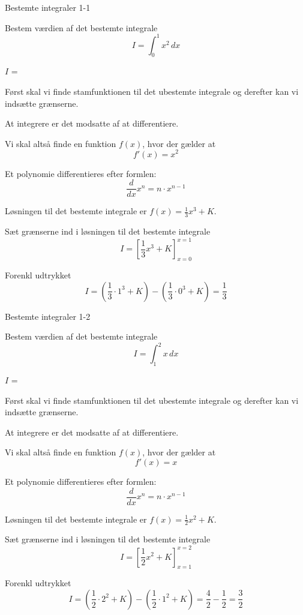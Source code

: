 \documentclass{article}
\begin{document}
\tableofcontents

\begin{exercise}{Bestemte integraler 1-1}

Bestem værdien af det bestemte integrale
\[
I = \int_0^1 x^2 \, dx
\]

$I$ =  


\hint
Først skal vi finde stamfunktionen til det ubestemte integrale og derefter kan vi indsætte grænserne.

\hint
At integrere er det modsatte af at differentiere.

\hint
Vi skal altså finde en funktion $f(x)$, hvor der gælder at
\[
f'(x) = x^2
\]

\hint
Et polynomie differentieres efter formlen:
\[
\frac{d}{dx} x^n = n \cdot x^{n - 1}
\]

\hint
Løsningen til det bestemte integrale er $f(x) = \frac{1}{3} x^3 + K$.

\hint
Sæt grænserne ind i løsningen til det bestemte integrale
\[
I = \left[ \frac{1}{3} x^3 + K \right]_{x=0}^{x=1}
\]

\hint
Forenkl udtrykket
\[
I = \left( \frac{1}{3} \cdot 1^3 + K \right) - \left( \frac{1}{3} \cdot 0^3 + K \right) = \frac{1}{3}
\]


\end{exercise}

\newpage

\begin{exercise}{Bestemte integraler 1-2}
	
	Bestem værdien af det bestemte integrale
	\[
	I = \int_1^2 x \, dx
	\]
	
	$I$ =  
	
	
	\hint
	Først skal vi finde stamfunktionen til det ubestemte integrale og derefter kan vi indsætte grænserne.
	
	\hint
	At integrere er det modsatte af at differentiere.
	
	\hint
	Vi skal altså finde en funktion $f(x)$, hvor der gælder at
	\[
	f'(x) = x
	\]
	
	\hint
	Et polynomie differentieres efter formlen:
	\[
	\frac{d}{dx} x^n = n \cdot x^{n - 1}
	\]
	
	\hint
	Løsningen til det bestemte integrale er $f(x) = \frac{1}{2} x^2 + K$.
	
	\hint
	Sæt grænserne ind i løsningen til det bestemte integrale
	\[
	I = \left[ \frac{1}{2} x^2 + K \right]_{x=1}^{x=2}
	\]
	
	\hint
	Forenkl udtrykket
	\[
	I = \left( \frac{1}{2} \cdot 2^2 + K \right) - \left( \frac{1}{2} \cdot 1^2 + K \right) = \frac{4}{2} - \frac{1}{2}=  \frac{3}{2}
	\]

	
\end{exercise}
\end{document}
